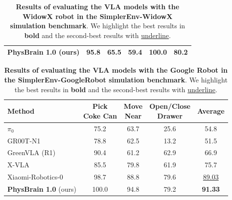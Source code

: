 \documentclass{llmxive}
\begin{document}
\begin{table}[!t]
\begin{adjustbox}{width=\linewidth}
\begin{tabular}{l c c c c c}
    \cmidrule(lr){1-6}

    \rowcolor{gray!30}\textbf{PhysBrain 1.0} (ours) & 95.8 & 65.5 & 59.4 &  100.0  & \textbf{80.2} \\
    \bottomrule
  \end{tabular}
  \end{adjustbox}
  \vspace{0.5 em}
  \label{tab:simplerenv_widowx_results}
\caption{
    \textbf{Results of evaluating the VLA models with the WidowX robot in the SimplerEnv-WidowX simulation benchmark}. We highlight the best results in \textbf{bold} and the second-best results with \underline{underline}.
    }
\end{table}

\begin{table}[!t]
  \centering
    \setlength{\tabcolsep}{15pt}
  \begin{adjustbox}{width=0.82\linewidth}
  \begin{tabular}{l c c c c}
    \toprule
    \textbf{Method}
     & \makecell[c]{\textbf{Pick} \\ \textbf{Coke Can}}
     & \makecell[c]{\textbf{Move} \\ \textbf{Near}}
     & \makecell[c]{\textbf{Open/Close} \\ \textbf{Drawer}}
     & \textbf{Average} \\
    \midrule
    $\pi_0$~\citep{PI0_2024_arXiv} & 75.2 & 63.7 & 25.6 & 54.8 \\
    GR00T-N1~\citep{GR00T_2025_arXiv} & 78.8 & 62.5 & 13.2 & 51.5 \\
    GreenVLA (R1)~\citep{GreenVLA_2026_arxiv} & 90.4 & 61.2 & 62.9 & 66.9 \\
    X-VLA~\citep{X-VLA_2025_arXiv} & 85.5 & 79.8 & 61.9 & 75.7 \\
    Xiaomi-Robotics-0~\citep{XiaomiRobotics0_2026_arxiv} & 98.7 & 88.8 & 79.6 & \underline{89.03} \\
    \midrule
    \rowcolor{gray!30}\textbf{PhysBrain 1.0} (ours) & 100.0 & 94.8 & 79.2 & \textbf{91.33} \\
    \bottomrule
  \end{tabular}
  \end{adjustbox}
  \vspace{0.5 em}
  \label{tab:simplerenv_googlerobot_results}
\caption{
    \textbf{Results of evaluating the VLA models with the Google Robot in the SimplerEnv-GoogleRobot simulation benchmark}. We highlight the best results in \textbf{bold} and the second-best results with \underline{underline}.
    }
\end{table}
\end{document}
